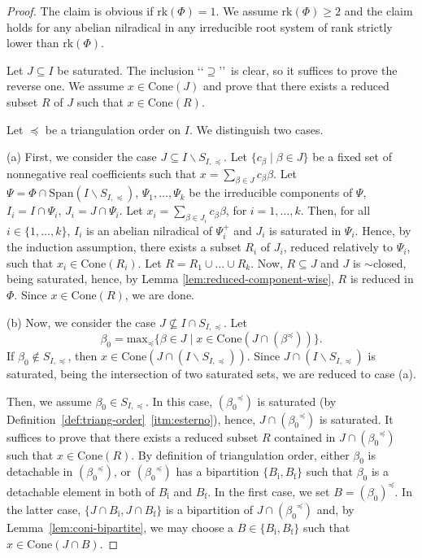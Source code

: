 \documentclass[10pt]{amsart}
\theoremstyle{definition}
\theoremstyle{remark}
\newcommand\nl{\par\noindent}
\newcommand\smeno{\smallsetminus}
\newcommand\cone{\mathrm{Cone}}
\newcommand\gen{\mathrm{Span}}
\newcommand\rk{\mathrm{rk}}
\newcommand\be{\beta}
\newcommand\preq{\preccurlyeq}
\begin{document}
\begin{proof}
The claim is obvious if $\rk(\Phi)=1$.
We assume $\rk(\Phi)\geq 2$ and  the claim holds for any abelian nilradical in any irreducible root system of rank strictly lower than $\rk(\Phi)$.
\par
Let $J\subseteq I$ be saturated.
The inclusion \lq\lq$\supseteq$\rq\rq\ is clear, so it suffices to prove the reverse one.
We assume $x\in \cone(J)$ and prove that there exists a reduced subset $R$ of $J$ such that $x\in \cone(R)$. 

\par
Let $\preq$ be a triangulation order on $I$. We distinguish two cases.
\par

(a) First, we consider the case $J\subseteq I\smeno S_{I, \preq}$.
Let $\{c_\be\mid \be\in J\}$  be a fixed set of nonnegative real coefficients such that $x=\sum\limits_{\be\in  J} c_\be \be$. 
Let $\Psi=\Phi\cap  \gen(I\smeno S_{I,\preq})$, $\Psi_1,\dots, \Psi_k$ be the irreducible components of $\Psi$, $I_i=I\cap \Psi_i$, $J_i=J\cap \Psi_i$.
Let $x_i=\sum\limits_{\be\in J_i} c_{\be}\be$, for $i=1,\dots,k$.
Then,  for all $i\in \{1,\dots,k\}$,  $I_i$ is an abelian nilradical of $\Psi_i^+$ and $J_i$ is saturated in $\Psi_i$.
Hence, by the induction assumption, there exists a subset $R_i$ of $J_i$, reduced relatively to $\Psi_i$, such that $x_i\in \cone(R_i)$.
Let $R=R_1 \cup\dots\cup R_k$. 
Now, $R\subseteq J$ and $J$ is $\sim$closed, being saturated, hence, by Lemma \ref{lem:reduced-component-wise}, $R$ is reduced in $\Phi$. 
Since  $x\in \cone(R)$,  we are done.


(b) Now, we consider the case $J\not\subseteq I\cap S_{I, \preq}$.
Let  
$$\be_0=\mathrm{max}_\preq\{\be\in J\mid x\in \cone(J\cap(\be^\preq))\}.$$
If $\be_0\not\in S_{I, \preq}$, then $x\in \cone (J\cap(I\smeno S_{I, \preq}))$. 
Since $J\cap(I\smeno S_{I, \preq})$ is saturated, being the intersection of two saturated sets, we are reduced to case (a).

\par
Then, we assume $\be_0\in S_{I, \preq}$.
In this case, $({\be_0}^\preq)$ is saturated (by Definition~\ref{def:triang-order}~\ref{itm:esterno}), hence, $J\cap ({\be_0}^\preq)$ is saturated. 
It suffices to prove that there exists a reduced subset $R$ contained in $J\cap ({\be_0}^\preq)$ such that  $x\in \cone(R)$.
By definition of triangulation order, either $\be_0$ is detachable in  $({\be_0}^\preq)$, or $({\be_0}^\preq)$ has a bipartition $\{B_{\mathrm i}, B_{\mathrm f}\}$ such that $\be_0$ is a detachable element in both of $B_{\mathrm i}$ and $B_{\mathrm f}$. 
In the first case, we set $B=(\be_0)^\preq$. 
In the latter case,  $\{J\cap B_{\mathrm i}, J\cap B_{\mathrm f}\}$ is a bipartition of $J\cap ({\be_0}^\preq)$ and, by Lemma~\ref{lem:coni-bipartite}, we may choose a  $B\in\{B_{\mathrm i}, B_{\mathrm f}\}$ such that  $x\in \cone(J\cap B)$.


\end{proof}
\end{document}
